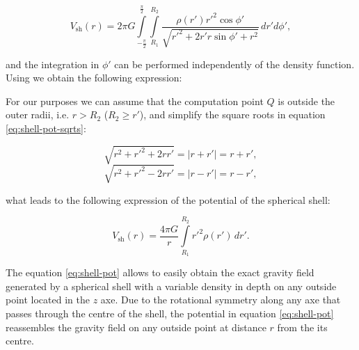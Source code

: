 \documentclass[extra]{gji}
\begin{document}
\begin{equation}
    V_\text{sh}(r) = 2\pi G 
    \int\limits_{-\frac{\pi}{2}}^\frac{\pi}{2}
    \int\limits_{R_1}^{R_2}
    \frac{\rho(r') {r'}^2 \cos\phi'}{\sqrt{r'^2 + 2 r' r \sin\phi' + r^2}}
    \, dr' d\phi',
\end{equation}

\noindent and the integration in $\phi'$ can be performed independently of the density function.
Using \citet{sagemath} we obtain the following expression:


For our purposes we can assume that the computation point $Q$ is outside the outer radii, i.e. $r>R_2$ ($R_2 \geq r'$), and simplify the square roots in equation \ref{eq:shell-pot-sqrts}:

\begin{equation}
    \sqrt{r^2 + r'^2 + 2rr'} = |r + r'| = r + r',
\end{equation}
\begin{equation}
    \sqrt{r^2 + r'^2 - 2rr'} = |r - r'| = r - r',
\end{equation}

\noindent what leads to the following expression of the potential of the spherical shell:

\begin{equation}
    V_\text{sh}(r) = \frac{4\pi G}{r}
    \int\limits_{R_1}^{R_2} {r'}^2 \rho(r') \, dr'.
\label{eq:shell-pot}
\end{equation}

The equation \ref{eq:shell-pot} allows to easily obtain the exact gravity field generated by a spherical shell with a variable density in depth on any outside point located in the $z$ axe.
Due to the rotational symmetry along any axe that passes through the centre of the shell, the potential in equation \ref{eq:shell-pot} reassembles the gravity field on any outside point at distance $r$ from the its centre.
\end{document}
